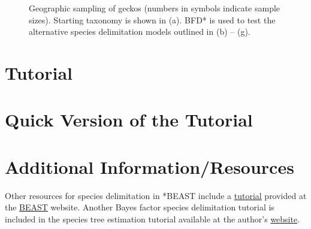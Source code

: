 \documentclass{article}
\newcommand{\program}[1]{#1\xspace}
\newcommand{\beast}{\href{http://beast2.org}{\program{BEAST}}\xspace}
\begin{document}
    \begin{figure}[htbp]
        \centering
        \caption{Geographic sampling of geckos (numbers in symbols indicate sample sizes). Starting taxonomy is shown in (a). BFD* is used to test the alternative species delimitation models outlined in (b) -- (g).}
        \label{fig:map}
    \end{figure}

\section{Tutorial}
\newcommand{\step}[2]{\addtocounter{stepCounter}{1} {\bf \hypertarget{step\arabic{stepCounter}}{Step \arabic{stepCounter}:}}\xspace #2\par}
\newcommand{\intermediate}[1]{#1}


\newpage
\section{Quick Version of the Tutorial}
\setcounter{stepCounter}{0}
\renewcommand{\step}[2]{\addtocounter{stepCounter}{1} {\bf \hyperlink{step\arabic{stepCounter}}{Step \arabic{stepCounter}}:}\xspace #1\par}
\renewcommand{\intermediate}[1]{}


\newpage
\section{Additional Information/Resources}
Other resources for species delimitation in *BEAST include a
\href{http://beast2.org}{tutorial} provided at the \beast website.  
Another Bayes factor species delimitation tutorial is included in 
the species tree estimation tutorial available at the author's \href{http://faculty.washington.edu/leache/wordpress/}{website}. 

\newpage

\end{document}

